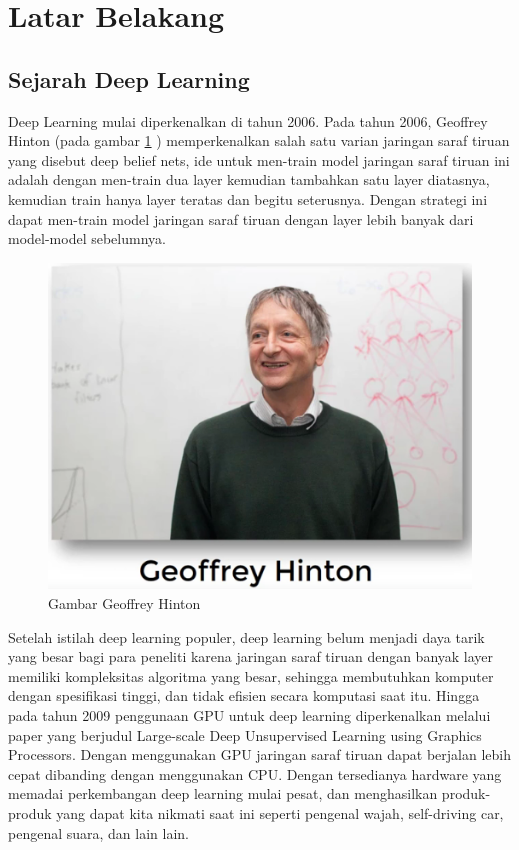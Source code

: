 \section{Latar Belakang}
\subsection{Sejarah Deep Learning}
Deep Learning mulai diperkenalkan di tahun 2006. Pada tahun 2006, Geoffrey Hinton (pada gambar \ref{labelgambar1} ) memperkenalkan salah satu varian jaringan saraf tiruan yang disebut deep belief nets, ide untuk men-train model jaringan saraf tiruan ini adalah dengan men-train dua layer kemudian tambahkan satu layer diatasnya, kemudian train hanya layer teratas dan begitu seterusnya. Dengan strategi ini dapat men-train model jaringan saraf tiruan dengan layer lebih banyak dari model-model sebelumnya.

\begin{figure}[h!]
	\centering
	\includegraphics[scale=0.4]{figures/7.PNG}
	\caption{Gambar Geoffrey Hinton}
	\label{labelgambar1}
	\end{figure}

Setelah istilah deep learning populer, deep learning belum menjadi daya tarik yang besar bagi para peneliti karena jaringan saraf tiruan dengan banyak layer memiliki kompleksitas algoritma yang besar, sehingga membutuhkan komputer dengan spesifikasi tinggi, dan tidak efisien secara komputasi saat itu. Hingga pada tahun 2009 penggunaan GPU untuk deep learning diperkenalkan melalui paper yang berjudul Large-scale Deep Unsupervised Learning using Graphics Processors. Dengan menggunakan GPU jaringan saraf tiruan dapat berjalan lebih cepat dibanding dengan menggunakan CPU. Dengan tersedianya hardware yang memadai perkembangan deep learning mulai pesat, dan menghasilkan produk-produk yang dapat kita nikmati saat ini seperti pengenal wajah, self-driving car, pengenal suara, dan lain lain.


